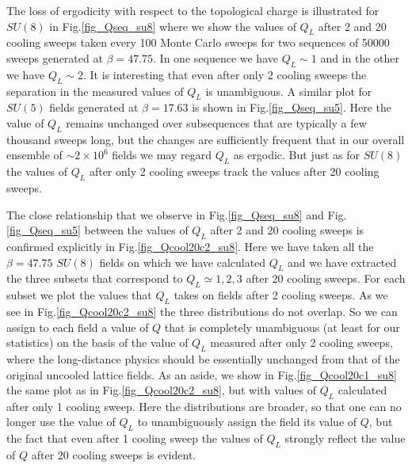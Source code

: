 \documentclass[12pt]{article}
\begin{document}
The loss of ergodicity with respect to the topological charge is illustrated for $SU(8)$
in Fig.\ref{fig_Qseq_su8} where we show the values of $Q_L$ after 2 and 20 cooling sweeps
taken every 100 Monte Carlo sweeps for two sequences of 50000 sweeps generated at $\beta=47.75$.
In one sequence we have $Q_L\sim 1$ and in the other we have $Q_L\sim 2$. It is interesting
that even after only 2 cooling sweeps the separation in the measured values of $Q_L$ is
unambiguous. A similar plot for $SU(5)$ fields generated at $\beta=17.63$ is shown in 
Fig.\ref{fig_Qseq_su5}. Here the value of $Q_L$ remains unchanged over subsequences that
are typically a few thousand sweeps long, but the changes are sufficiently frequent that
in our overall ensemble of $\sim 2\times 10^6$ fields we may regard $Q_L$ as ergodic.
But just as for $SU(8)$ the values of $Q_L$ after only 2 cooling sweeps track the
values after 20 cooling sweeps.

The close relationship that we observe in Fig.\ref{fig_Qseq_su8} and Fig.\ref{fig_Qseq_su5}
between the values of $Q_L$ after 2 and 20 cooling sweeps is confirmed explicitly in
Fig.\ref{fig_Qcool20c2_su8}. Here we have taken all the $\beta=47.75$ $SU(8)$ fields on which
we have calculated $Q_L$ and we have extracted the three subsets that correspond to
$Q_L \simeq 1,2,3$ after 20 cooling sweeps. For each subset we plot the values that
$Q_L$ takes on fields after 2 cooling sweeps. As we see in Fig.\ref{fig_Qcool20c2_su8}
the three distributions do not overlap. So we can assign to each field a value of $Q$ that
is completely unambiguous (at least for our statistics) on the basis of the value of $Q_L$
measured after only 2 cooling sweeps, where the long-distance physics should be essentially
unchanged from that of the original uncooled lattice fields. As an aside, we show
in Fig.\ref{fig_Qcool20c1_su8} the same plot as in Fig.\ref{fig_Qcool20c2_su8}, but
with values of $Q_L$ calculated after only 1 cooling sweep. Here the distributions are
broader, so that one can no longer use the value of $Q_L$ to unambiguously assign the
field its value of $Q$, but the fact that even  after 1 cooling sweep the values
of $Q_L$ strongly reflect the value of $Q$ after 20 cooling sweeps is evident. 
\end{document}
